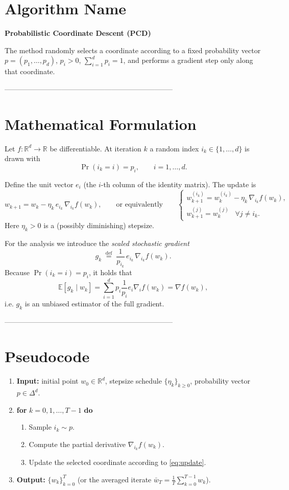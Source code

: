 \documentclass{article}
\newcommand{\E}{\mathbb{E}}
\newcommand{\R}{\mathbb{R}}
\begin{document}
\section*{Algorithm Name}
\textbf{Probabilistic Coordinate Descent (PCD)}  

The method randomly selects a coordinate according to a fixed probability vector
$p=(p_1,\dots ,p_d)$, $p_i>0$, $\sum_{i=1}^{d}p_i=1$, and performs a gradient step only
along that coordinate.

-----------------------------------------------------------------------

\section*{Mathematical Formulation}
Let $f:\R^{d}\to\R$ be differentiable.  
At iteration $k$ a random index $i_k\in\{1,\dots ,d\}$ is drawn with
\[
\Pr(i_k=i)=p_i,\qquad i=1,\dots ,d .
\]

Define the unit vector $e_i$ (the $i$-th column of the identity matrix).  
The update is
\begin{equation}
\label{eq:update}
w_{k+1}=w_k-\eta_k\,e_{i_k}\,\nabla_{i_k}f(w_k),
\qquad\text{or equivalently}\qquad
\begin{cases}
w_{k+1}^{(i_k)}=w_k^{(i_k)}-\eta_k\,\nabla_{i_k}f(w_k),\\[2mm]
w_{k+1}^{(j)}=w_k^{(j)}\;\;\; \forall j\neq i_k .
\end{cases}
\end{equation}
Here $\eta_k>0$ is a (possibly diminishing) stepsize.

For the analysis we introduce the \emph{scaled stochastic gradient}
\[
g_k\;\stackrel{\text{def}}{=}\;\frac{1}{p_{i_k}}\,e_{i_k}\,\nabla_{i_k}f(w_k).
\tag{1}
\]
Because $\Pr(i_k=i)=p_i$, it holds that
\[
\E\!\left[g_k\mid w_k\right]=\sum_{i=1}^{d}p_i\frac{1}{p_i}e_i\nabla_i f(w_k)
      =\nabla f(w_k),
\]
i.e. $g_k$ is an unbiased estimator of the full gradient.

-----------------------------------------------------------------------

\section*{Pseudocode}
\begin{enumerate}[label=\textbf{Step \arabic*:}, leftmargin=*]
\item \textbf{Input:} initial point $w_0\in\R^{d}$, stepsize schedule $\{\eta_k\}_{k\ge0}$,
probability vector $p\in\Delta^{d}$.
\item \textbf{for} $k=0,1,\dots ,T-1$ \textbf{do}
\begin{enumerate}[label=\arabic*.]
\item Sample $i_k\sim p$.
\item Compute the partial derivative $\nabla_{i_k}f(w_k)$.
\item Update the selected coordinate according to \eqref{eq:update}.
\end{enumerate}
\item \textbf{Output:} $\{w_k\}_{k=0}^{T}$ (or the averaged iterate $\bar w_T=\frac1T\sum_{k=0}^{T-1}w_k$).
\end{enumerate}
\end{document}
